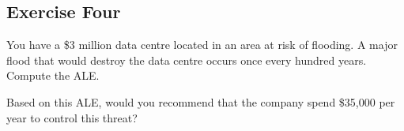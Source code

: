 \documentclass{article}
\begin{document}
\vspace{75mm}

\subsection*{Exercise Four}
You have a \$3 million data centre located in an area at risk of flooding. A major flood that would destroy the data centre occurs once every hundred years. Compute the ALE.

\vspace{60mm}

Based on this ALE, would you recommend that the company spend \$35,000 per year to control this threat?
\end{document}

